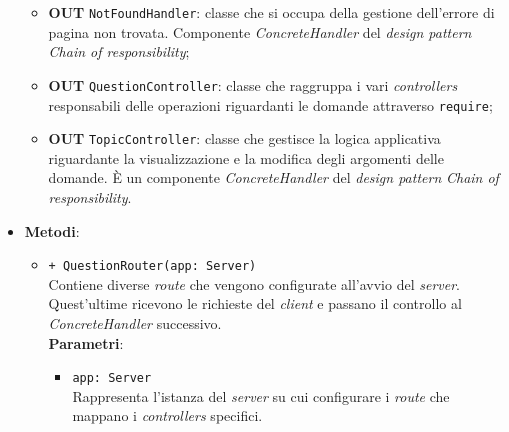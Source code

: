 \begin{itemize}
\begin{itemize}
			\item \textbf{OUT} \texttt{NotFoundHandler}: classe che si occupa della gestione dell’errore di pagina non trovata. Componente \textit{ConcreteHandler} del \textit{design pattern} \textit{Chain of responsibility};
			\item \textbf{OUT} \texttt{QuestionController}: classe che raggruppa i vari \textit{controllers} responsabili delle operazioni riguardanti le domande attraverso \texttt{require};
			\item \textbf{OUT} \texttt{TopicController}: classe che gestisce la logica applicativa riguardante la visualizzazione e la modifica degli argomenti delle domande. È un componente \textit{ConcreteHandler} del \textit{design pattern} \textit{Chain of responsibility}.
		\end{itemize}
		\item \textbf{Metodi}:
		\begin{itemize}
			\item \texttt{+ QuestionRouter(app: Server)}\\
			Contiene diverse \textit{route} che vengono configurate all’avvio del \textit{server}. Quest’ultime ricevono le richieste del \textit{client} e passano il controllo al \textit{ConcreteHandler} successivo.\\
			\textbf{Parametri}:
			\begin{itemize}
				\item \texttt{app: Server}\\
				Rappresenta l’istanza del \textit{server} su cui configurare i \textit{route} che mappano i \textit{controllers} specifici.
			\end{itemize}
		\end{itemize}
	\end{itemize}